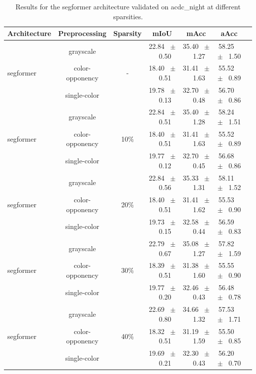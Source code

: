 \begin{table}[h]
  \centering
  \caption{Results for the segformer architecture validated on acdc_night at different sparsities.}
  \begin{tabular}{@{}lccc ccc@{}}
    \toprule
    Architecture & Preprocessing & Sparsity & mIoU & mAcc & aAcc \\
    \midrule

    \multirow{3}{*}{segformer} & grayscale & \multirow{3}{*}{-} & 22.84 ~$\pm$~ 0.50 & 35.40 ~$\pm$~ 1.27 & 58.25 ~$\pm$~ 1.50 \\
    & color-opponency &  & 18.40 ~$\pm$~ 0.51 & 31.41 ~$\pm$~ 1.63 & 55.52 ~$\pm$~ 0.89 \\
    & single-color &  & 19.78 ~$\pm$~ 0.13 & 32.70 ~$\pm$~ 0.48 & 56.70 ~$\pm$~ 0.86 \\
    \midrule
    \multirow{3}{*}{segformer} & grayscale & \multirow{3}{*}{10\%} & 22.84 ~$\pm$~ 0.51 & 35.40 ~$\pm$~ 1.28 & 58.24 ~$\pm$~ 1.51 \\
    & color-opponency &  & 18.40 ~$\pm$~ 0.51 & 31.41 ~$\pm$~ 1.63 & 55.52 ~$\pm$~ 0.89 \\
    & single-color &  & 19.77 ~$\pm$~ 0.12 & 32.70 ~$\pm$~ 0.45 & 56.68 ~$\pm$~ 0.86 \\
    \midrule
    \multirow{3}{*}{segformer} & grayscale & \multirow{3}{*}{20\%} & 22.84 ~$\pm$~ 0.56 & 35.33 ~$\pm$~ 1.31 & 58.11 ~$\pm$~ 1.52 \\
    & color-opponency &  & 18.40 ~$\pm$~ 0.51 & 31.41 ~$\pm$~ 1.62 & 55.53 ~$\pm$~ 0.90 \\
    & single-color &  & 19.73 ~$\pm$~ 0.15 & 32.58 ~$\pm$~ 0.44 & 56.59 ~$\pm$~ 0.83 \\
    \midrule
    \multirow{3}{*}{segformer} & grayscale & \multirow{3}{*}{30\%} & 22.79 ~$\pm$~ 0.67 & 35.08 ~$\pm$~ 1.27 & 57.82 ~$\pm$~ 1.59 \\
    & color-opponency &  & 18.39 ~$\pm$~ 0.51 & 31.38 ~$\pm$~ 1.60 & 55.55 ~$\pm$~ 0.90 \\
    & single-color &  & 19.77 ~$\pm$~ 0.20 & 32.46 ~$\pm$~ 0.43 & 56.48 ~$\pm$~ 0.78 \\
    \midrule
    \multirow{3}{*}{segformer} & grayscale & \multirow{3}{*}{40\%} & 22.69 ~$\pm$~ 0.80 & 34.66 ~$\pm$~ 1.32 & 57.53 ~$\pm$~ 1.71 \\
    & color-opponency &  & 18.32 ~$\pm$~ 0.51 & 31.19 ~$\pm$~ 1.59 & 55.50 ~$\pm$~ 0.85 \\
    & single-color &  & 19.69 ~$\pm$~ 0.21 & 32.30 ~$\pm$~ 0.43 & 56.20 ~$\pm$~ 0.70 \\

\end{tabular}
\end{table}
